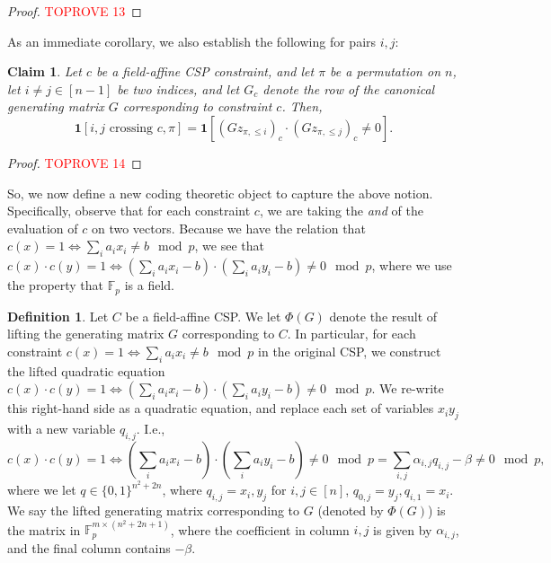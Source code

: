 \documentclass[11pt]{article}
\newtheorem{claim}[theorem]{Claim}
\theoremstyle{definition}
\newtheorem{definition}{Definition}[section]
\newcommand{\F}{\mathbb{F}}
\newcommand{\zo}{\{0, 1\}}
\begin{document}
\begin{proof}\textcolor{red}{TOPROVE 13}\end{proof}

As an immediate corollary, we also establish the following for pairs $i,j$:

\begin{claim}\label{clm:crossingProductGeneral}
	Let $c$ be a field-affine CSP constraint, and let $\pi$ be a permutation on $n$, let $i \neq j \in [n-1]$ be two indices, and let $G_c$ denote the row of the canonical generating matrix $G$ corresponding to constraint $c$. Then, 
	\[
	\mathbf{1}[i,j \text{ crossing } c, \pi] = \mathbf{1} [(G z_{\pi, \leq i})_c \cdot (G z_{\pi, \leq j})_c \neq 0].
	\]
\end{claim}

\begin{proof}\textcolor{red}{TOPROVE 14}\end{proof}

So, we now define a new coding theoretic object to capture the above notion. Specifically, observe that for each constraint $c$, we are taking the \emph{and} of the evaluation of $c$ on two vectors. Because we have the relation that $c(x) = 1 \iff \sum_{i} a_i x_i \neq b \mod p$, we see that $c(x) \cdot c(y) =1 \iff (\sum_{i} a_i x_i - b) \cdot (\sum_{i} a_i y_i -b) \neq 0 \mod p$, where we use the property that $\F_p$ is a field.  

\begin{definition}\label{def:liftedGeneratingGeneral}
Let $C$ be a field-affine CSP. We let $\Phi(G)$ denote the result of lifting the generating matrix $G$ corresponding to $C$. In particular, for each constraint $c(x) = 1 \iff \sum_{i} a_i x_i \neq b \mod p$ in the original CSP, we construct the lifted quadratic equation $c(x) \cdot c(y) =1 \iff (\sum_{i} a_i x_i - b) \cdot (\sum_{i} a_i y_i -b) \neq 0 \mod p$. We re-write this right-hand side as a quadratic equation, and replace each set of variables $x_i y_j$ with a new variable $q_{i,j}$. I.e.,
\[
c(x) \cdot c(y) =1 \iff (\sum_{i} a_i x_i - b) \cdot (\sum_{i} a_i y_i -b) \neq 0 \mod p = \sum_{i,j} \alpha_{i,j} q_{i,j} - \beta \neq 0 \mod p,
\]
where we let $q\in\zo^{n^2 + 2n}$, where $q_{i,j}  = x_i, y_j$ for $i, j \in [n]$, $q_{0, j} = y_j, q_{i, 1} = x_i$.
We say the lifted generating matrix corresponding to $G$ (denoted by $\Phi(G)$) is the matrix in $\F_p^{m \times (n^2+2n + 1)}$, where the coefficient in column $i,j$ is given by $\alpha_{i,j}$, and the final column contains $- \beta$.
\end{definition}
\end{document}
